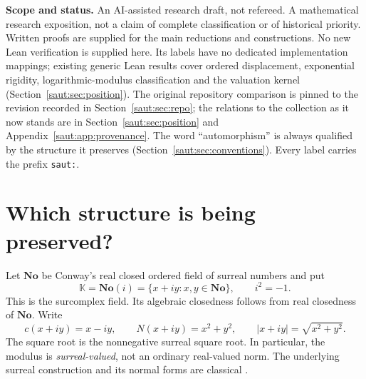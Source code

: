 \documentclass[11pt]{article}
\theoremstyle{definition}
\theoremstyle{remark}
\newcommand{\No}{\mathbf{No}}
\newcommand{\R}{\mathbb R}
\newcommand{\K}{\mathbb K}
\newcommand{\Oz}{\mathbf{Oz}}
\numberwithin{equation}{section}
\begin{document}
\begin{titlepage}
\begin{minipage}{0.93\textwidth}
\begin{abstract}
A second source (Sections~16--30) conjugates finite groups of valued Hahn-field
automorphisms to their coefficient action by a norm section, and classifies the
involutions of $\No(i)$ preserving the valuation and $\Oz[i]$: exactly
$2^{\mathfrak c}$ conjugacy types, indexed by real closed fields $F$ of
transcendence degree $\mathfrak c$, with fixed field $F((t^{\No}))$, a copy of $\No$
exactly when $F\cong\R$. A third source (Sections~31--40) re-derives this
independently, adds an explicit strong inverse of the conjugator by formal
inversion and a descent for strong finite actions in every characteristic, and
shows that the $2^{\mathfrak c}$ fixed rings have the same finite quotients and the
same solvable integer equations.
\end{abstract}
\end{minipage}
\vfill
\begin{minipage}{0.93\textwidth}
\small
\textbf{Scope and status.} An AI-assisted research draft, not refereed.
A mathematical research exposition, not a claim of
complete classification or of historical priority. Written proofs are supplied
for the main reductions and constructions. No new Lean verification is
supplied here. Its labels have no dedicated implementation mappings;
existing generic Lean results cover ordered displacement, exponential
rigidity, logarithmic-modulus classification and the valuation kernel
(Section~\ref{saut:sec:position}). The original repository comparison is
pinned to the revision recorded in Section~\ref{saut:sec:repo}; the relations
to the collection as it now stands are in
Section~\ref{saut:sec:position} and Appendix~\ref{saut:app:provenance}.
The word ``automorphism'' is always qualified by the structure it preserves
(Section~\ref{saut:sec:conventions}). Every label carries the prefix
\texttt{saut:}.
\end{minipage}
\end{titlepage}
\hypersetup{pageanchor=true}
{\fontsize{9.5}{11}\selectfont\setlength{\parskip}{0pt}\tableofcontents}
\clearpage
{}

\section{Which structure is being preserved?}\label{saut:sec:introduction}

Let $\No$ be Conway's real closed ordered field of surreal numbers and put
\[
 \K=\No(i)=\{x+iy:x,y\in\No\},\qquad i^2=-1.
\]
This is the surcomplex field. Its algebraic closedness follows from real
closedness of $\No$. Write
\[
 c(x+iy)=x-iy,
 \qquad N(x+iy)=x^2+y^2,
 \qquad |x+iy|=\sqrt{x^2+y^2}.
\]
The square root is the nonnegative surreal square root. In particular, the
modulus is \emph{surreal-valued}, not an ordinary real-valued norm.
The underlying surreal construction and its normal forms are classical
\cite{Conway,Gonshor}.
\end{document}
